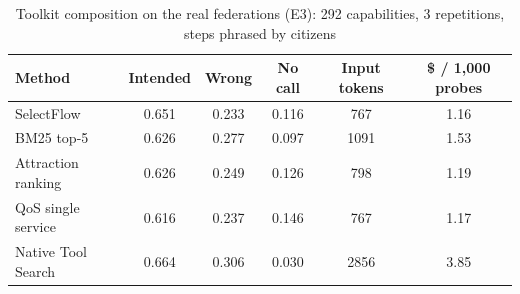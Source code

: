 \begin{table}[t]
\caption{Toolkit composition on the real federations (E3): 292 capabilities, 3 repetitions, steps phrased by citizens}
\label{tab:e3}
\centering\small
\begin{tabular}{@{}lccccc@{}}
\toprule
Method & Intended & Wrong & No call & Input tokens & \$ / 1,000 probes \\
\midrule
SelectFlow & 0.651 & 0.233 & 0.116 & 767 & 1.16 \\
BM25 top-5 & 0.626 & 0.277 & 0.097 & 1091 & 1.53 \\
Attraction ranking & 0.626 & 0.249 & 0.126 & 798 & 1.19 \\
QoS single service & 0.616 & 0.237 & 0.146 & 767 & 1.17 \\
Native Tool Search & 0.664 & 0.306 & 0.030 & 2856 & 3.85 \\
\bottomrule
\end{tabular}
\end{table}

